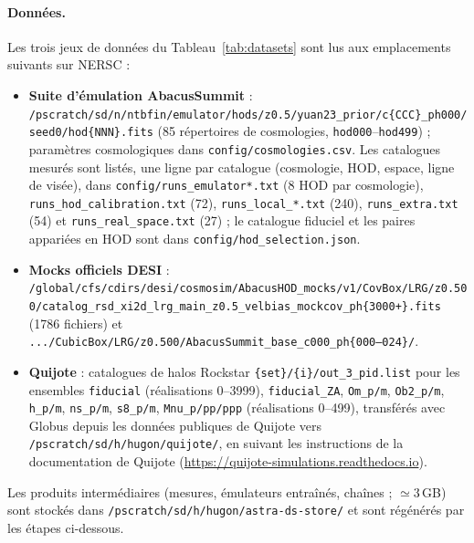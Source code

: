 \documentclass[11pt,twocolumn]{article}
\begin{document}
\paragraph{Données.} Les trois jeux de données du Tableau~\ref{tab:datasets} sont lus aux emplacements suivants sur NERSC :
\begin{itemize}
\item \textbf{Suite d'émulation AbacusSummit} : \texttt{/pscratch/sd/n/ntbfin/emulator/hods/z0.5/yuan23\_prior/c\{CCC\}\_ph000/seed0/hod\{NNN\}.fits} (85 répertoires de cosmologies, \texttt{hod000}--\texttt{hod499}) ; paramètres cosmologiques dans \texttt{config/cosmologies.csv}. Les catalogues mesurés sont listés, une ligne par catalogue (cosmologie, HOD, espace, ligne de visée), dans \texttt{config/runs\_emulator*.txt} (8 HOD par cosmologie), \texttt{runs\_hod\_calibration.txt} (72), \texttt{runs\_local\_*.txt} (240), \texttt{runs\_extra.txt} (54) et \texttt{runs\_real\_space.txt} (27) ; le catalogue fiduciel et les paires appariées en HOD sont dans \texttt{config/hod\_selection.json}.
\item \textbf{Mocks officiels DESI} : \texttt{/global/cfs/cdirs/desi/cosmosim/AbacusHOD\_mocks/v1/CovBox/LRG/z0.500/catalog\_rsd\_xi2d\_lrg\_main\_z0.5\_velbias\_mockcov\_ph\{3000+\}.fits} (1786 fichiers) et \texttt{.../CubicBox/LRG/z0.500/AbacusSummit\_base\_c000\_ph\{000--024\}/}.
\item \textbf{Quijote} : catalogues de halos Rockstar \texttt{\{set\}/\{i\}/out\_3\_pid.list} pour les ensembles \texttt{fiducial} (réalisations 0--3999), \texttt{fiducial\_ZA}, \texttt{Om\_p/m}, \texttt{Ob2\_p/m}, \texttt{h\_p/m}, \texttt{ns\_p/m}, \texttt{s8\_p/m}, \texttt{Mnu\_p/pp/ppp} (réalisations 0--499), transférés avec Globus depuis les données publiques de Quijote vers \texttt{/pscratch/sd/h/hugon/quijote/}, en suivant les instructions de la documentation de Quijote (\url{https://quijote-simulations.readthedocs.io}).
\end{itemize}
Les produits intermédiaires (mesures, émulateurs entraînés, chaînes ; $\simeq3$\,GB) sont stockés dans \texttt{/pscratch/sd/h/hugon/astra-ds-store/} et sont régénérés par les étapes ci-dessous.
\end{document}
